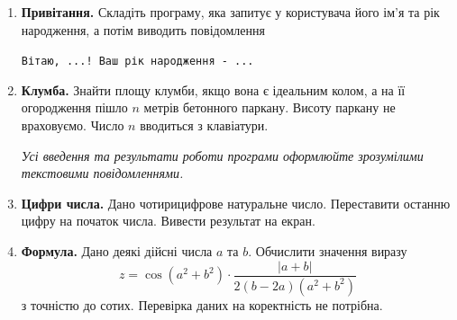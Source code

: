 \begin{enumerate}

\item \textbf{Привітання.} Складіть програму, яка запитує у користувача його ім'я та рік народження, а потім виводить повідомлення

\verb|Вітаю, ...! Ваш рік народження - ...|

\item \textbf{Клумба.} Знайти площу клумби, якщо вона є ідеальним колом, а на її огородження пішло $n$ метрів бетонного паркану. Висоту паркану не враховуємо. Число $n$ вводиться з клавіатури.

{\itshape Усі введення та результати роботи програми оформлюйте зрозумілими текстовими повідомленнями.}

\item \textbf{Цифри числа.} Дано чотирицифрове натуральне число. Переставити останню цифру на початок числа. Вивести результат на екран.

\item \textbf{Формула.} Дано деякі дійсні числа $a$ та $b$. Обчислити значення виразу
$$
z=\cos(a^2+b^2)\cdot\dfrac{|a+b|}{2(b-2a)(a^2+b^2)}
$$
з точністю до сотих. Перевірка даних на коректність не потрібна.
\end{enumerate}

